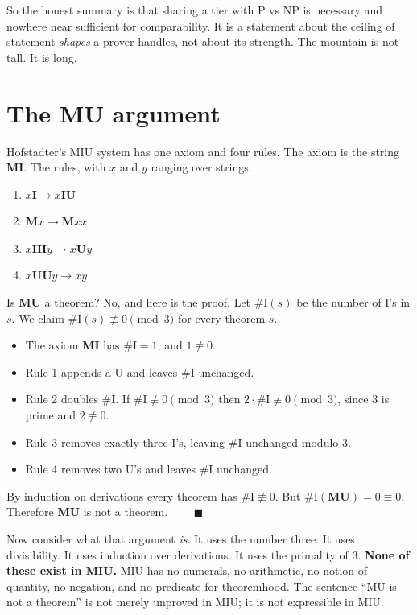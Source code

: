 \documentclass[11pt,a4paper]{article}
\begin{document}
So the honest summary is that sharing a tier with P vs NP is necessary and
nowhere near sufficient for comparability. It is a statement about the ceiling
of statement-\emph{shapes} a prover handles, not about its strength. The
mountain is not tall. It is long.

\section{The MU argument}

Hofstadter's MIU system has one axiom and four rules. The axiom is the string
\textbf{MI}. The rules, with $x$ and $y$ ranging over strings:

\begin{enumerate}
\item $x\textbf{I} \to x\textbf{IU}$
\item $\textbf{M}x \to \textbf{M}xx$
\item $x\textbf{III}y \to x\textbf{U}y$
\item $x\textbf{UU}y \to xy$
\end{enumerate}

Is \textbf{MU} a theorem? No, and here is the proof. Let $\#\mathrm{I}(s)$ be
the number of I's in $s$. We claim $\#\mathrm{I}(s) \not\equiv 0 \pmod 3$ for
every theorem $s$.

\begin{itemize}
\item The axiom \textbf{MI} has $\#\mathrm{I} = 1$, and $1 \not\equiv 0$.
\item Rule 1 appends a U and leaves $\#\mathrm{I}$ unchanged.
\item Rule 2 doubles $\#\mathrm{I}$. If $\#\mathrm{I} \not\equiv 0 \pmod 3$
then $2\cdot\#\mathrm{I} \not\equiv 0 \pmod 3$, since $3$ is prime and
$2 \not\equiv 0$.
\item Rule 3 removes exactly three I's, leaving $\#\mathrm{I}$ unchanged
modulo $3$.
\item Rule 4 removes two U's and leaves $\#\mathrm{I}$ unchanged.
\end{itemize}

By induction on derivations every theorem has $\#\mathrm{I} \not\equiv 0$. But
$\#\mathrm{I}(\textbf{MU}) = 0 \equiv 0$. Therefore \textbf{MU} is not a
theorem. $\qquad\blacksquare$

Now consider what that argument \emph{is}. It uses the number three. It uses
divisibility. It uses induction over derivations. It uses the primality of
$3$. \textbf{None of these exist in MIU.} MIU has no numerals, no arithmetic,
no notion of quantity, no negation, and no predicate for theoremhood. The
sentence ``MU is not a theorem'' is not merely unproved in MIU; it is not
expressible in MIU.
\end{document}
